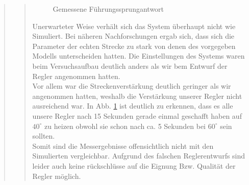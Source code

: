 \begin{quote}
\begin{quote}
        \begin{figure}[H]
            \centering{}
            \caption{Gemessene Führungssprungantwort}
            \label{fig:5}
        \end{figure}
        \vspace{1em}
        
        Unerwarteter Weise verhält sich das System überhaupt nicht wie Simuliert. Bei näheren Nachforschungen ergab
        sich, dass sich die Parameter der echten Strecke zu stark von denen des vorgegeben Modells unterscheiden hatten. Die
        Einstellungen des Systems waren beim Versuchsaufbau deutlich anders als wir bem Entwurf der Regler angenommen
        hatten.\\
        Vor allem war die Streckenverstärkung deutlich geringer als wir angenommen hatten, weshalb die Verstärkung
        unserer Regler nicht ausreichend war. In Abb. \ref{fig:5} ist deutlich zu erkennen, dass es alle
        unsere Regler nach 15 Sekunden gerade einmal geschafft haben auf $40^{\circ}$ zu heizen obwohl sie schon nach
        ca. 5 Sekunden bei $60^{\circ}$ sein sollten.\\
        Somit sind die Messergebnisse offensichtlich nicht mit den Simulierten vergleichbar. Aufgrund des falschen
        Reglerentwurfs sind leider auch keine rückschlüsse auf die Eignung Bzw. Qualität der Regler möglich.
        
        


    \end{quote}
    
    
    
    
\end{quote}

